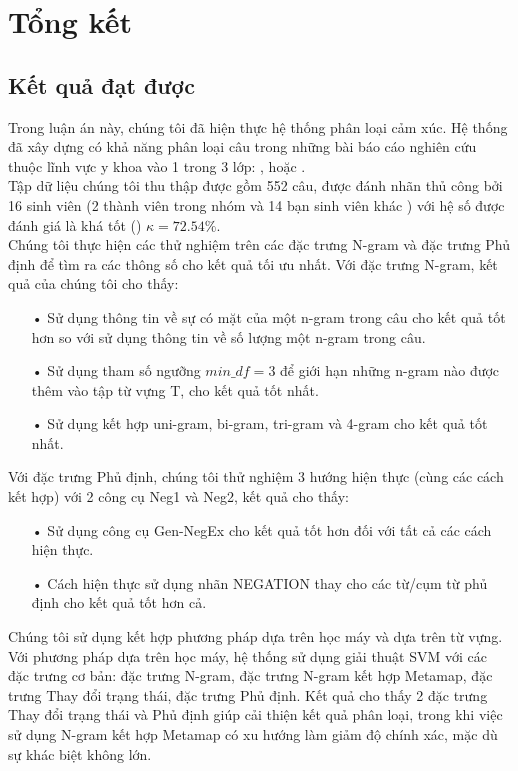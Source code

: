 \section{Tổng kết}
\subsection{Kết quả đạt được}
Trong luận án này, chúng tôi đã hiện thực hệ thống phân loại cảm xúc. Hệ thống đã xây dựng có khả năng phân loại câu trong những bài báo cáo nghiên cứu thuộc lĩnh vực y khoa vào 1 trong 3 lớp: \tichcuc, \tieucuc hoặc \trungtinh. \\

Tập dữ liệu chúng tôi thu thập được gồm 552 câu, được đánh nhãn thủ công bởi 16 sinh viên (2 thành viên trong nhóm và 14 bạn sinh viên khác ) với hệ số  được đánh giá là khá tốt () $\kappa=72.54\%$.\\

Chúng tôi thực hiện các thử nghiệm trên các đặc trưng N-gram và đặc trưng Phủ định để tìm ra các thông số cho kết quả tối ưu nhất. Với đặc trưng N-gram, kết quả của chúng tôi cho thấy:
\begin{itemize}
\item[•] Sử dụng thông tin về sự có mặt của một n-gram trong câu cho kết quả tốt hơn so với sử dụng thông tin về số lượng một n-gram trong câu.
\item[•] Sử dụng tham số ngưỡng $min\_df=3$ để giới hạn những n-gram nào được thêm vào tập từ vựng T, cho kết quả tốt nhất.
\item[•] Sử dụng kết hợp uni-gram, bi-gram, tri-gram và 4-gram cho kết quả tốt nhất.
\end{itemize}
Với đặc trưng Phủ định, chúng tôi thử nghiệm 3 hướng hiện thực (cùng các cách kết hợp) với 2 công cụ Neg1 và Neg2, kết quả cho thấy:
\begin{itemize}
\item[•] Sử dụng công cụ Gen-NegEx cho kết quả tốt hơn đối với tất cả các cách hiện thực.
\item[•] Cách hiện thực sử dụng nhãn NEGATION thay cho các từ/cụm từ phủ định cho kết quả tốt hơn cả.
\end{itemize}

Chúng tôi sử dụng kết hợp phương pháp dựa trên học máy và dựa trên từ vựng. Với phương pháp dựa trên học máy, hệ thống sử dụng giải thuật SVM với các đặc trưng cơ bản: đặc trưng N-gram, đặc trưng N-gram kết hợp Metamap, đặc trưng Thay đổi trạng thái, đặc trưng Phủ định. Kết quả cho thấy 2 đặc trưng Thay đổi trạng thái và Phủ định giúp cải thiện kết quả phân loại, trong khi việc sử dụng N-gram kết hợp Metamap có xu hướng làm giảm độ chính xác, mặc dù sự khác biệt không lớn.

